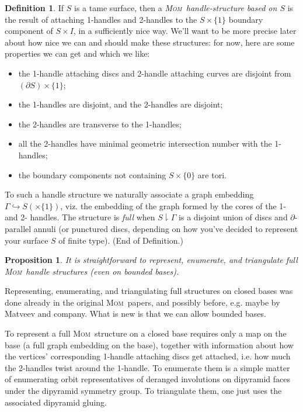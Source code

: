 \documentclass{article}
\theoremstyle{plain}
\newtheorem{proposition}[theorem]{Proposition}
\theoremstyle{plain}
\theoremstyle{definition}
\newtheorem{definition}[theorem]{Definition}
\numberwithin{equation}{section}
\newcommand{\MOM}{\textsc{Mom}}
\begin{document}
\begin{definition}\label{defn:init}
If $S$ is a tame surface, then a \emph{\MOM\ handle-structure based on $S$}
is the result of attaching 1-handles and 2-handles to the $S\times \{1\}$
boundary component of $S\times I$, in a sufficiently nice way. We'll want
to be more precise later about how nice we can and should make these structures:
for now, here are some properties we can get and which we like:
\begin{itemize}
\item the 1-handle attaching discs and 2-handle attaching curves are disjoint
      from $(\partial S) \times \{1\}$;
\item the 1-handles are disjoint, and the 2-handles are disjoint;
\item the 2-handles are transverse to the 1-handles;
\item all the 2-handles have minimal geometric intersection number with the 1-handles;
\item the boundary components not containing $S\times\{0\}$ are tori.
\end{itemize}

To such a handle structure we naturally associate a graph embedding
$\Gamma \hookrightarrow S (\times \{1\})$, viz. the embedding of the graph formed
by the cores of the 1- and 2- handles. The structure is \emph{full}
when $S \downharpoonright \Gamma$ is a disjoint union of discs and
$\partial$-parallel annuli (or punctured discs, depending on how
you've decided to represent your surface $S$ of finite type).
(End of Definition.)
\end{definition}
\begin{proposition}
It is straightforward to represent, enumerate, and triangulate
full \MOM\ handle structures (even on bounded bases).
\end{proposition}
\proof[Sketch]
Representing, enumerating, and triangulating full structures
on closed bases was done already in the original \MOM\ papers,
and possibly before, e.g. maybe by Matveev and company. What
is new is that we can allow bounded bases.

To represent a full \MOM\ structure on a closed base
requires only a map on the base (a full graph embedding on
the base), together with information about how the vertices'
corresponding 1-handle attaching discs get attached, i.e.
how much the 2-handles twist around the 1-handle. To enumerate
them is a simple matter of enumerating orbit representatives
of deranged involutions on dipyramid faces under the dipyramid
symmetry group. To triangulate them, one just uses the associated
dipyramid gluing.
\end{document}
